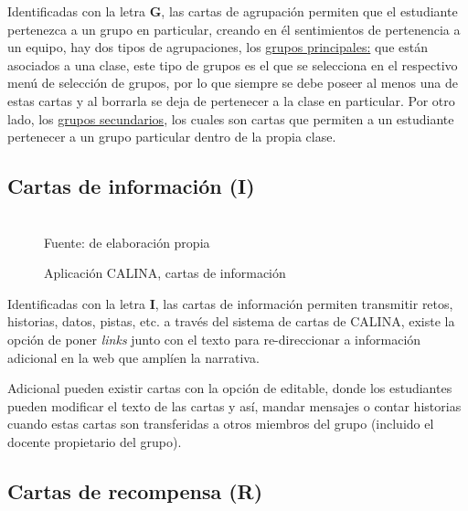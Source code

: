 Identificadas con la letra \textbf{G}, las cartas de agrupación permiten que el estudiante pertenezca a un 
grupo en particular, creando en él sentimientos de pertenencia a un equipo, hay dos tipos de agrupaciones, los 
\uline{grupos principales:} que están asociados a una clase, este tipo de grupos es el que se selecciona en el 
respectivo menú de selección de grupos, por lo que siempre se debe poseer al menos una de estas cartas y al 
borrarla se deja de pertenecer a la clase en particular. Por otro lado, los \uline{grupos secundarios}, los 
cuales son cartas que permiten a un estudiante pertenecer a un grupo particular dentro de la propia clase.

\subsection{Cartas de información (I)}

\begin{figure}[!htb]
\caption[]{Aplicación CALINA, cartas de información}
\centering
{}
\hspace{2cm}
\\
{\footnotesize Fuente: de elaboración propia}
\end{figure}

Identificadas con la letra \textbf{I}, las cartas de información permiten transmitir retos, historias, datos,
pistas, etc. a través del sistema de cartas de CALINA, existe la opción de poner \textit{links} junto con el 
texto para re-direccionar a información adicional en la web que amplíen la narrativa.

Adicional pueden existir cartas con la opción de editable, donde los estudiantes pueden modificar el texto de 
las cartas y así, mandar mensajes o contar historias cuando estas cartas son transferidas a otros miembros del 
grupo (incluido el docente propietario del grupo).

\subsection{Cartas de recompensa (R)}

